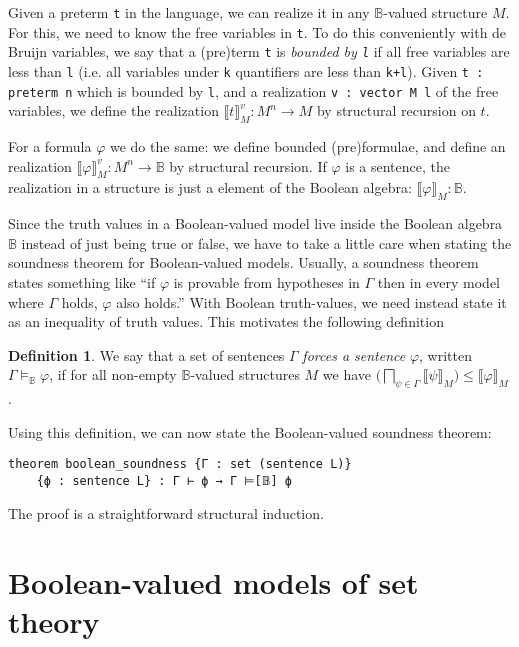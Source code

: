 \documentclass[sigplan,10pt,review, autoref,anonymous]{acmart}
\newcommand{\B}{\mathbb{B}}
\newcommand{\lil}{\lstinline}
\theoremstyle{definition}
\newtheorem{defn}{Definition}[section]
\begin{document}
Given a preterm \lil{t} in the language, we can realize it in any $\B$-valued structure $M$.
For this, we need to know the free variables in \lil{t}.
To do this conveniently with de Bruijn variables, we say that a (pre)term \lil{t} is \emph{bounded by \lil{l}} if all free variables are less than \lil{l} (i.e. all variables under \lil{k} quantifiers are less than \lil{k+l}).
Given \lil{t : preterm n} which is bounded by \lil{l}, and a realization \lil{v : vector M l} of the free variables, we define the realization $\llbracket t \rrbracket_M^v : M^n \to M$ by structural recursion on $t$.

For a formula $\varphi$ we do the same: we define bounded (pre)formulae, and define an realization $\llbracket \varphi \rrbracket_M^v : M^n \to \B$ by structural recursion.
If $\varphi$ is a sentence, the realization in a structure is just a element of the Boolean algebra: $\llbracket \varphi \rrbracket_M : \B$.

Since the truth values in a Boolean-valued model live inside the Boolean algebra $\B$ instead of just being true or false, we have to take a little care when stating the soundness theorem for Boolean-valued models.
Usually, a soundness theorem states something like ``if $\varphi$ is provable from hypotheses in $\Gamma$ then in every model where $\Gamma$ holds, $\varphi$ also holds.''
With Boolean truth-values, we need instead state it as an inequality of truth values. This motivates the following definition
\begin{defn}
We say that a set of sentences $\Gamma$ \emph{forces a sentence} $\varphi$, written $\Gamma \models_{\B}\varphi$, if for all non-empty $\B$-valued structures $M$ we have $\big(\bigsqcap_{\psi\in\Gamma}\big \llbracket \psi \rrbracket_M)\le\llbracket \varphi \rrbracket_M$.
\end{defn}
Using this definition, we can now state the Boolean-valued soundness theorem: \label{boolean-soundness}
\begin{lstlisting}
theorem boolean_soundness {Γ : set (sentence L)}
    {ϕ : sentence L} : Γ ⊢ ϕ → Γ ⊨[𝔹] ϕ
\end{lstlisting}
The proof is a straightforward structural induction.

\section{Boolean-valued models of set theory}
\label{section:bset}
\end{document}
